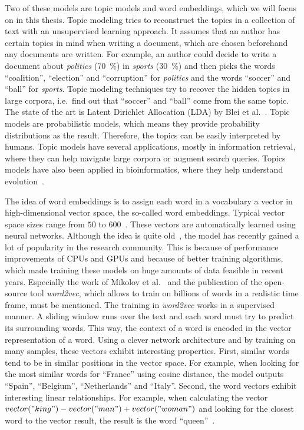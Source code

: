\documentclass[
        a4paper,
        titlepage,
        twoside,
        parskip
        ]{scrbook}
\theoremstyle{break}
\begin{document}
Two of these models are topic models and word embeddings, which we will focus on in this thesis.
Topic modeling tries to reconstruct the topics in a collection of text with an unsupervised learning approach.
It assumes that an author has certain topics in mind when writing a document, which are chosen beforehand any documents are written.
For example, an author could decide to write a document about \emph{politics} (70~\%) in \emph{sports} (30~\%) and then picks the words ``coalition'', ``election'' and ``corruption'' for \emph{politics} and the words ``soccer'' and ``ball'' for \emph{sports}.
Topic modeling techniques try to recover the hidden topics in large corpora, i.e.\ find out that ``soccer'' and ``ball'' come from the same topic.
The state of the art is Latent Dirichlet Allocation (LDA) by Blei et al.~\cite{Blei2003}.
Topic models are probabilistic models, which means they provide probability distributions as the result.
Therefore, the topics can be easily interpreted by humans.
Topic models have several applications, mostly in information retrieval, where they can help navigate large corpora or augment search queries.
Topics models have also been applied in bioinformatics, where they help understand evolution~\cite{Pritchard2000}.

The idea of word embeddings is to assign each word in a vocabulary a vector in high-dimensional vector space, the so-called word embeddings.
Typical vector space sizes range from $50$ to $600$~\cite{Mikolov2013}.
These vectors are automatically learned using neural networks.
Although the idea is quite old~\cite{Bengio2003,Rumelhart1988}, the model has recently gained a lot of popularity in the research community.
This is because of performance improvements of CPUs and GPUs and because of better training algorithms, which made training these models on huge amounts of data feasible in recent years.
Especially the work of Mikolov et al.~\cite{Mikolov2013b,Mikolov2013,Mikolov2013a} and the publication of the open-source tool \emph{word2vec}, which allows to train on billions of words in a realistic time frame, must be mentioned.
The training in \emph{word2vec} works in a supervised manner.
A sliding window runs over the text and each word must try to predict its surrounding words.
This way, the context of a word is encoded in the vector representation of a word.
Using a clever network architecture and by training on many samples, these vectors exhibit interesting properties.
First, similar words tend to be in similar positions in the vector space.
For example, when looking for the most similar words for ``France'' using cosine distance, the model outputs ``Spain'', ``Belgium'', ``Netherlands'' and ``Italy''.
Second, the word vectors exhibit interesting linear relationships.
For example, when calculating the vector $vector("king") - vector("man") + vector("woman")$ and looking for the closest word to the vector result, the result is the word ``queen''~\cite{Mikolov2013b}.
\end{document}
